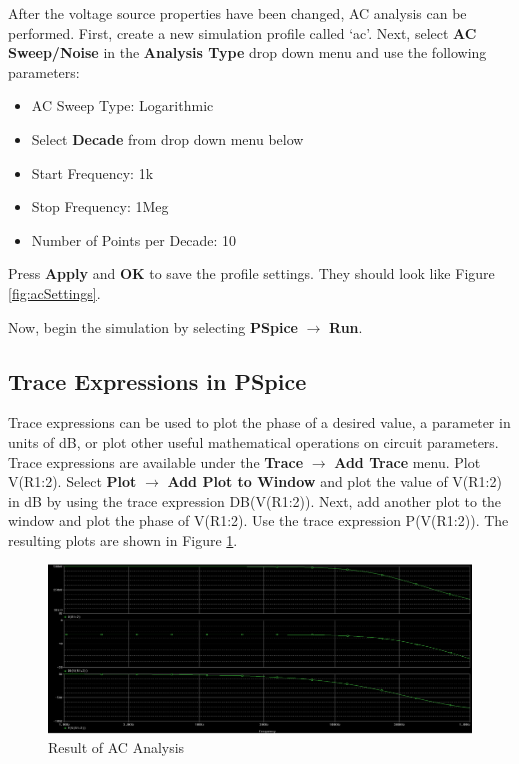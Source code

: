 \documentclass[12pt]{../manual}
\begin{document}
After the voltage source properties have been changed, AC analysis can be performed. First, create a new simulation profile called `ac'. Next, select \textbf{AC Sweep/Noise} in the \textbf{Analysis Type} drop down menu and use the following parameters:
\begin{itemize}
\item AC Sweep Type: Logarithmic 
\item Select \textbf{Decade} from drop down menu below
\item Start Frequency: 1k
\item Stop Frequency: 1Meg
\item Number of Points per Decade: 10
\end{itemize}
Press \textbf{Apply} and \textbf{OK} to save the profile settings. They should look like Figure \ref{fig:acSettings}.

Now, begin the simulation by selecting \textbf{PSpice} $\to$ \textbf{Run}.

\subsection*{Trace Expressions in PSpice}
Trace expressions can be used to plot the phase of a desired value, a parameter in units of dB, or plot other useful mathematical operations on circuit parameters. Trace expressions are available under the \textbf{Trace} $\to$ \textbf{Add Trace} menu. Plot V(R1:2). Select \textbf{Plot} $\to$ \textbf{Add Plot to Window} and plot the value of V(R1:2) in dB by using the trace expression DB(V(R1:2)). Next, add another plot to the window and plot the phase of V(R1:2). Use the trace expression P(V(R1:2)). The resulting plots are shown in Figure \ref{fig:acAnalRes}.

\begin{figure}[ht!]
\begin{center}
\includegraphics[width=\textwidth]{figures/ResultACAnalysisCrop.PNG}
\caption{Result of AC Analysis}
\label{fig:acAnalRes}
\end{center}
\end{figure}
%
\newpage
\end{document}
